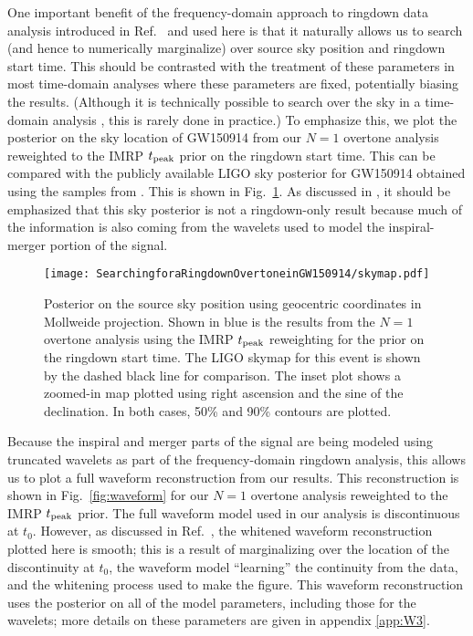 One important benefit of the frequency-domain approach to ringdown data analysis introduced in Ref.~\cite{Finch:2021qph} and used here is that it naturally allows us to search (and hence to numerically marginalize) over source sky position and ringdown start time. 
This should be contrasted with the treatment of these parameters in most time-domain analyses where these parameters are fixed, potentially biasing the results. (Although it is technically possible to search over the sky in a time-domain analysis \cite{Carullo:2019flw, Isi:2021iql}, this is rarely done in practice.)
To emphasize this, we plot the posterior on the sky location of GW150914 from our $N=1$ overtone analysis reweighted to the IMRP $t_{\rm peak}$ prior on the ringdown start time.
This can be compared with the publicly available LIGO sky posterior for GW150914 obtained using the samples from \cite{skysamples}.
This is shown in Fig.~\ref{fig:skymap}.
As discussed in \cite{Finch:2021qph}, it should be emphasized that this sky posterior is not a ringdown-only result because much of the information is also coming from the wavelets used to model the inspiral-merger portion of the signal.

\begin{figure}[t]
    \centering
    \texttt{[image: SearchingforaRingdownOvertoneinGW150914/skymap.pdf]}
    \caption[Posterior on the GW150914 source sky position]{ 
    Posterior on the source sky position using geocentric coordinates in Mollweide projection.
    Shown in blue is the results from the $N=1$ overtone analysis using the IMRP $t_{\rm peak}$ reweighting for the prior on the ringdown start time.
    The LIGO skymap for this event is shown by the dashed black line for comparison.
    The inset plot shows a zoomed-in map plotted using right ascension and the sine of the declination.
    In both cases, 50\% and 90\% contours are plotted.
    }
    \label{fig:skymap}
\end{figure}

Because the inspiral and merger parts of the signal are being modeled using truncated wavelets as part of the frequency-domain ringdown analysis, this allows us to plot a full waveform reconstruction from our results.
This reconstruction is shown in Fig.~\ref{fig:waveform} for our $N=1$ overtone analysis reweighted to the IMRP $t_{\rm peak}$ prior.
The full waveform model used in our analysis is discontinuous at $t_0$. However, as discussed in Ref.~\cite{Finch:2021qph}, the whitened waveform reconstruction plotted here is smooth; this is a result of marginalizing over the location of the discontinuity at $t_0$, the waveform model ``learning'' the continuity from the data, and the whitening process used to make the figure.
This waveform reconstruction uses the posterior on all of the model parameters, including those for the wavelets; more details on these parameters are given in appendix \ref{app:W3}.

